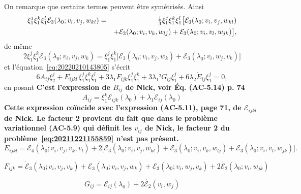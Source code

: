 \documentclass[12pt, final]{amsart}
\begin{document}
On remarque que certains termes peuvent être symétrisés. Ainsi
\begin{eqnarray}
  \notag
  \xi _1^j\xi _1^k\xi _1^l\mathcal E_3(\lambda _0; v_i, v_j, w_{kl})
  &=&\tfrac13\xi _1^j\xi _1^k\xi _1^l\bigl[\mathcal E_3(\lambda _0; v_i, v_j, w_{kl})\\
  &&+\mathcal E_3(\lambda _0; v_i, v_k, w_{lj})+\mathcal E_3(\lambda _0; v_i, v_l, w_{jk})\bigr],
\end{eqnarray}
de même
\begin{equation}
  2\xi _1^j\xi _1^k\mathcal E_3(\lambda _0; v_i, v_j, w_k)=\xi _1^j\xi _1^k\bigl[\mathcal E_3(\lambda _0; v_i, v_j, w_k)
  +\mathcal E_3(\lambda _0; v_i, w_j, v_k)\bigr]
\end{equation}
et l'équation~\eqref{eq:20220210143805} s'écrit
\begin{equation}
\label{eq:20220216141706}
  6A_{ij}\xi _2^j+E_{ijkl}\,\xi _1^j\xi _1^k\xi _1^l+3\lambda _1F_{ijk}\xi _1^j\xi _1^k+3\lambda _1²G_{ij}\xi _1^j
  +6\lambda _2\mathring{E}_{ij}\xi _1^j=0,
\end{equation}
en posant \textbf{C'est l'expression de \(B_{ij}\) de Nick, voir
  Éq. (AC-5.14) p. 74}
\begin{equation}
  A_{ij}=\xi _1^k\mathcal E_{ijk}(\lambda _0)+\lambda _1\dot{\mathcal E}_{ij}(\lambda _0)
\end{equation}
\textbf{Cette expression coïncide avec l'expression
  (AC-5.11), page 71, de \(\mathcal E_{ijkl}\) de Nick. Le facteur 2 provient du fait que
  dans le problème variationnel (AC-5.9) qui définit les \(v_{ij}\) de Nick, le
  facteur 2 du problème~\eqref{eq:20211221155859} n'est pas présent.}
\begin{equation}
  E_{ijkl}=\mathcal E_4(\lambda _0; v_i, v_j, v_k, v_l)+2\bigl[\mathcal E_3(\lambda _0; v_i, v_j, w_{kl})
  +\mathcal E_3(\lambda _0; v_i, v_k, w_{lj})+\mathcal E_3(\lambda _0; v_i, v_l, w_{jk})\bigr].
\end{equation}

\begin{equation}
  F_{ijk}=\dot{\mathcal E}_3(\lambda _0; v_i, v_j, v_k)+\mathcal E_3(\lambda _0; v_i, v_j, w_k)
  +\mathcal E_3(\lambda _0; v_i, w_j, v_k)+2\dot{\mathcal E_2}(\lambda _0; v_i, w_{jk})
\end{equation}

\begin{equation}
  G_{ij}=\ddot{\mathcal E}_{ij}(\lambda _0)+2\dot{\mathcal E_2}(v_i, w_j)
\end{equation}
\end{document}
